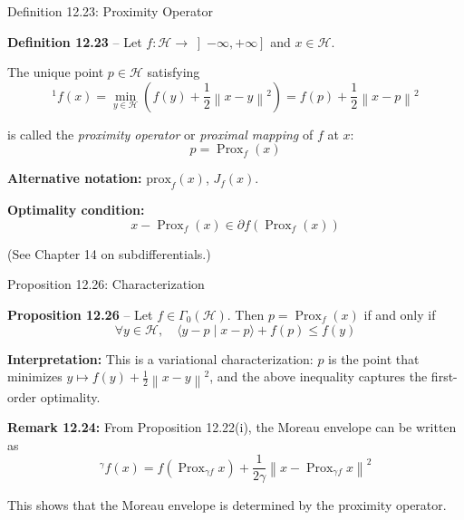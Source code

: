 \documentclass[aspectratio=169,10pt]{beamer}
\newcommand{\cH}{\mathcal{H}}
\newcommand{\norm}[1]{\left\|#1\right\|}
\newcommand{\Prox}{\operatorname{Prox}}
\newcommand{\me}[1]{{}^{#1}\!f}
\begin{document}
\begin{frame}{Definition 12.23: Proximity Operator}

  \textbf{Definition 12.23} -- Let $f: \cH \to \left]-\infty, +\infty\right]$ and $x \in \cH$.

  The unique point $p \in \cH$ satisfying
  \[
    \me{1}(x) = \min_{y \in \cH} \left( f(y) + \frac{1}{2} \norm{x - y}^2 \right) = f(p) + \frac{1}{2} \norm{x - p}^2
  \]

  is called the \textit{proximity operator} or \textit{proximal mapping} of $f$ at $x$:
  \[
    p = \Prox_f(x)
  \]

  \vspace{1cm}

  \textbf{Alternative notation:} $\text{prox}_f(x)$, $J_f(x)$.

  \vspace{0.5cm}

  \textbf{Optimality condition:}
  \[
    x - \Prox_f(x) \in \partial f(\Prox_f(x))
  \]

  (See Chapter 14 on subdifferentials.)

\end{frame}

\begin{frame}[allowframebreaks]{Proposition 12.26: Characterization}

  \textbf{Proposition 12.26} -- Let $f \in \Gamma_0(\cH)$. Then $p = \Prox_f(x)$
  if and only if
  \[
    \forall y \in \cH, \quad \langle y - p \mid x - p \rangle + f(p) \le f(y)
  \]

  \vspace{1cm}

  \textbf{Interpretation:} This is a variational characterization: $p$ is
  the point that minimizes $y \mapsto f(y) + \frac{1}{2}\norm{x - y}^2$,
  and the above inequality captures the first-order optimality.

  \framebreak

  \textbf{Remark 12.24:} From Proposition 12.22(i), the Moreau envelope
  can be written as
  \[
    \me{\gamma}(x) = f(\Prox_{\gamma f} x) + \frac{1}{2\gamma} \norm{x - \Prox_{\gamma f} x}^2
  \]

  This shows that the Moreau envelope is determined by the proximity operator.

\end{frame}
\end{document}
